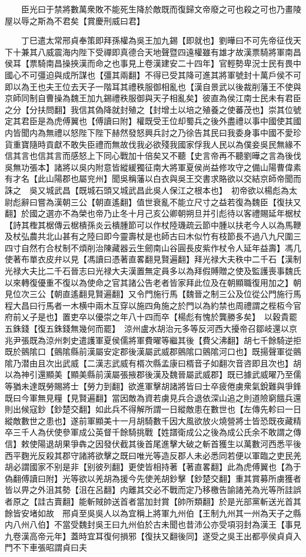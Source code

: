 　　臣光曰于禁將數萬衆敗不能死生降於敵既而復歸文帝廢之可也殺之可也乃畫陵屋以辱之斯為不君矣【賞慶刑威曰君】

　　丁巳遣太常邢貞奉策即拜孫權為吳王加九錫【即就也】劉曄曰不可先帝征伐天下十兼其八威震海内陛下受禪即真德合天地聲暨四遠權雖有雄才故漢票騎將軍南昌侯耳【票騎南昌操挾漢而命之也事見上卷漢建安二十四年】官輕勢卑況士民有畏中國心不可彊迫與成所謀也【彊其兩翻】不得已受其降可進其將軍號封十萬戶侯不可即以為王也夫王位去天子一階耳其禮秩服御相亂也【漢自景武以後裁削藩王不使與京師同制自曹操為魏王加九錫禮秩服御與天子相亂矣】彼直為侯江南士民未有君臣之分【分扶問翻】我信其偽降就封殖之【封增土以培之殖養之使蕃茂也】崇其位號定其君臣是為虎傅翼也【傅讀曰附】權既受王位却蜀兵之後外盡禮以事中國使其國内皆聞内為無禮以怒陛下陛下赫然發怒興兵討之乃徐告其民曰我委身事中國不愛珍貨重寶隨時貢獻不敢失臣禮而無故伐我必欲殘我國家俘我人民以為僕妾吳民無緣不信其言也信其言而感怒上下同心戰加十倍矣又不聽【史言帝再不聽劉曄之言為後伐吳無功張本】諸將以吳内附意皆縱緩獨征南大將軍夏侯尚益修攻守之備山陽曹偉素有才名【此山陽郡也屬兖州】聞吳稱藩以白衣與吳王交書求賂欲以交結京師帝聞而誅之　吳又城武昌【既城石頭又城武昌此吳人保江之根本也】　初帝欲以楊彪為太尉彪辭曰嘗為漢朝三公【朝直遙翻】值世衰亂不能立尺寸之益若復為魏臣【復扶又翻】於國之選亦不為榮也帝乃止冬十月己亥公卿朝朔旦并引彪待以客禮賜延年椐杖【詩其檉其椐傳云椐樻孫炎云樻腫節可以作杖陸璣疏云節中腫以扶老今人以為馬鞭及杖弘農共北山甚有之陸曰即今靈壽杖是也師古曰木似竹有枝節長不過八九尺圍三四寸自然冇合杖制不煩削治陳藏器云生劒南山谷圓長皮紫作杖令人延年益壽】馮几使著布單衣皮弁以見【馮讀曰憑著直畧翻見賢遍翻】拜光禄大夫秩中二千石【漢制光禄大夫比二千石晉志曰光禄大夫漢置無定員多以為拜假賻贈之使及監護喪事魏氏以來轉復優重不復以為使命之官其諸公告老者皆家拜此位及在朝顯職復用加之】朝見位次三公【朝直遙翻見賢遍翻】又令門施行馬【魏晉之制三公及位從公門施行馬程大昌曰行馬者一木横中兩木互穿以施四角施之於門以為約禁也周禮謂之梐枑今官府前乂子是也】置吏卒以優崇之年八十四而卒【楊彪有愧於龔勝多矣】　以穀貴罷五銖錢【復五銖錢無幾何而罷】　涼州盧水胡治元多等反河西大擾帝召鄒岐還以京兆尹張既為涼州刺史遣護軍夏侯儒將軍費曜等繼其後【費父沸翻】胡七千餘騎逆拒既於鸇隂口【鸇隂縣前漢屬安定郡後漢屬武威郡鸇隂口鸇隂河口也】既揚聲軍從鸇隂乃潜由且次出武威【二漢志武威有楈次縣孟康曰楈音子如翻次音咨即且次也】胡以為神引還顯美【顯美縣前漢屬張掖郡後漢及魏晉屬武威郡】既已據武威曜乃至儒等猶未達既勞賜將士【勞力到翻】欲進軍擊胡諸將皆曰士卒疲倦虜衆氣銳難與爭鋒既曰今軍無見糧【見賢遍翻】當因敵為資若虜見兵合退依深山追之則道險窮餓兵還則出候寇鈔【鈔楚交翻】如此兵不得解所謂一日縱敵患在數世也【左傳先軫曰一日縱敵數世之患也】遂前軍顯美十一月胡騎數千因大風欲放火燒營將士皆恐既夜藏精卒三千人為伏使參軍成公英督千餘騎挑戰【姓譜衛成公之後為成公氏余不敢謂之傳信】敕使陽退胡果爭犇之因發伏截其後首尾進擊大破之斬首獲生以萬數河西悉平後西平麴光反殺其郡守諸將欲擊之既曰唯光等造反郡人未必悉同若便以軍臨之吏民羌胡必謂國家不别是非【别彼列翻】更使皆相持著【著直畧翻】此為虎傅翼也【為于偽翻傅讀曰附】光等欲以羌胡為援今先使羌胡鈔擊【鈔楚交翻】重其賞募所虜獲者皆以畀之外沮其勢【沮在呂翻】内離其交必不戰而定乃移檄告諭諸羌為光等所詿誤者原之【詿古賣翻】能斬賊帥送首者當加封賞【帥所類翻】於是光部黨斬送光首其餘皆安堵如故　邢貞至吳吳人以為宜稱上將軍九州伯【王制九州其一州為天子之縣内八州八伯】不當受魏封吳王曰九州伯於古未聞也昔沛公亦受項羽封為漢王【事見九卷漢高帝元年】蓋時宜耳復何損邪【復扶又翻後同】遂受之吳王出都亭侯貞貞入門不下車張昭謂貞曰夫